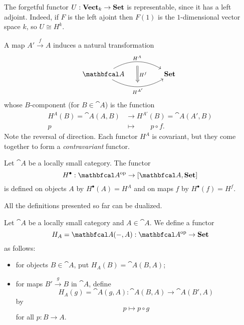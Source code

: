 \documentclass[11pt,a4paper]{article}
\begin{document}
\begin{example}
    The forgetful functor $U:\mathbf{Vect}_k\to\mathbf{Set}$ is representable, since it has a left adjoint. Indeed, if $F$ is the left ajoint then $F(1)$ is the $1$-dimensional vector space $k$, so $U\cong H^k$.
\end{example}

A map $A'\xrightarrow{f}A$ induces a natural transformation
\begin{equation*}
\begin{tikzcd}
    \cat{A}
    \arrow[rr, bend left=30, "H^A"{name=t}]
    \arrow[rr, bend right=30, "H^{A'}"'{name=b}]
    && \bcat{Set} \
    \arrow[from=t, Rightarrow, to=b, "H^f", shorten <= 6pt, shorten >= 6pt]
\end{tikzcd}
\end{equation*}
whose $B$-component (for $B\in\cat{A}$) is the function
\begin{align*}
    H^A(B)=\cat{A}(A,B) &\to H^{A'}(B)=\cat{A}(A',B)\\
    p\qquad &\mapsto \qquad p\circ f.
\end{align*}
Note the reversal of direction. Each functor $H^A$ is covariant, but they come together to form a \textit{contravariant} functor.

\begin{definition}
    Let $\cat{A}$ be a locally small category. The functor
    \begin{equation*}
        H^{\bullet}: \catop{A}\to[\cat{A}, \bcat{Set}]
    \end{equation*}
    is defined on objects $A$ by $H^{\bullet}(A)=H^A$ and on maps $f$ by $H^{\bullet}(f)=H^f$.
\end{definition}

All the definitions presented so far can be dualized.

\begin{definition}
    Let $\cat{A}$ be a locally small category and $A\in\cat{A}$. We define a functor
    \begin{equation*}
        H_A=\cat{A}(-,A): \catop{A}\to\bcat{Set}
    \end{equation*}
    as follows:
    \begin{itemize}
        \item for objects $B\in\cat{A}$, put $H_A(B)=\cat{A}(B,A)$;
        \item for maps $B'\xrightarrow{g}B$ in $\cat{A}$, define
            \begin{equation*}
                H_A(g)=\cat{A}(g,A): \cat{A}(B,A)\to\cat{A}(B',A)
            \end{equation*}
            by
            \begin{equation*}
                p\mapsto p\circ g
            \end{equation*}
            for all $p:B\to A$.
    \end{itemize}
\end{definition}
\end{document}
